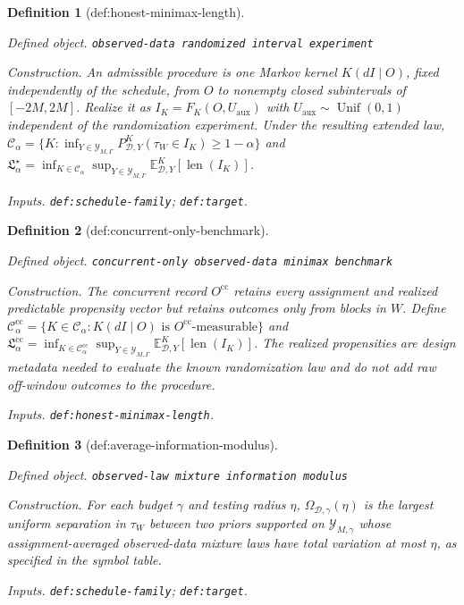 \documentclass{article}
\newtheorem{definition}{Definition}
\begin{document}
\begin{definition}[def:honest-minimax-length]\label{def:honest-minimax-length}
\par\smallskip\noindent\emph{Defined object.} \texttt{observed-\allowbreak{}data randomized interval experiment}
\par\smallskip\noindent\emph{Construction.} An admissible procedure is one Markov kernel \(K(dI\mid O)\), fixed independently of the schedule, from \(O\) to nonempty closed subintervals of \([-2M,2M]\). Realize it as \(I_K=F_K(O,U_{\mathrm{aux}})\) with \(U_{\mathrm{aux}}\sim\operatorname{Unif}(0,1)\) independent of the randomization experiment. Under the resulting extended law, \(\mathcal C_\alpha=\{K:\inf_{Y\in\mathcal Y_{M,\Gamma}}P^K_{\mathcal D,Y}(\tau_W\in I_K)\ge1-\alpha\}\) and \(\mathfrak L_\alpha^\star=\inf_{K\in\mathcal C_\alpha}\sup_{Y\in\mathcal Y_{M,\Gamma}}\mathbb E^K_{\mathcal D,Y}[\operatorname{len}(I_K)]\).
\par\smallskip\noindent\emph{Inputs.} \texttt{def:\allowbreak{}schedule-\allowbreak{}family}; \texttt{def:\allowbreak{}target}.
\end{definition}

\begin{definition}[def:concurrent-only-benchmark]\label{def:concurrent-only-benchmark}
\par\smallskip\noindent\emph{Defined object.} \texttt{concurrent-\allowbreak{}only observed-\allowbreak{}data minimax benchmark}
\par\smallskip\noindent\emph{Construction.} The concurrent record \(O^{\mathrm{cc}}\) retains every assignment and realized predictable propensity vector but retains outcomes only from blocks in \(W\). Define \(\mathcal C_\alpha^{\mathrm{cc}}=\{K\in\mathcal C_\alpha:K(dI\mid O)\text{ is }O^{\mathrm{cc}}\text{-measurable}\}\) and \(\mathfrak L_\alpha^{\mathrm{cc}}=\inf_{K\in\mathcal C_\alpha^{\mathrm{cc}}}\sup_{Y\in\mathcal Y_{M,\Gamma}}\mathbb E^K_{\mathcal D,Y}[\operatorname{len}(I_K)]\). The realized propensities are design metadata needed to evaluate the known randomization law and do not add raw off-window outcomes to the procedure.
\par\smallskip\noindent\emph{Inputs.} \texttt{def:\allowbreak{}honest-\allowbreak{}minimax-\allowbreak{}length}.
\end{definition}

\begin{definition}[def:average-information-modulus]\label{def:average-information-modulus}
\par\smallskip\noindent\emph{Defined object.} \texttt{observed-\allowbreak{}law mixture information modulus}
\par\smallskip\noindent\emph{Construction.} For each budget \(\gamma\) and testing radius \(\eta\), \(\Omega_{\mathcal D,\gamma}(\eta)\) is the largest uniform separation in \(\tau_W\) between two priors supported on \(\mathcal Y_{M,\gamma}\) whose assignment-averaged observed-data mixture laws have total variation at most \(\eta\), as specified in the symbol table.
\par\smallskip\noindent\emph{Inputs.} \texttt{def:\allowbreak{}schedule-\allowbreak{}family}; \texttt{def:\allowbreak{}target}.
\end{definition}
\end{document}
